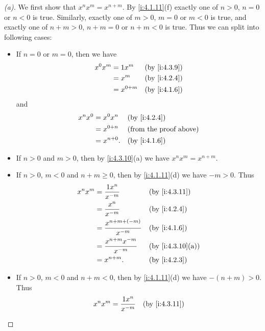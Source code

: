 \begin{proof}[(a)]
  We first show that \(x^n x^m = x^{n + m}\).
  By \cref{i:4.1.11}(f) exactly one of \(n > 0\), \(n = 0\) or \(n < 0\) is true.
  Similarly, exactly one of \(m > 0\), \(m = 0\) or \(m < 0\) is true, and exactly one of \(n + m > 0\), \(n + m = 0\) or \(n + m < 0\) is true.
  Thus we can split into following cases:
  \begin{itemize}
    \item If \(n = 0\) or \(m = 0\), then we have
          \begin{align*}
            x^0 x^m & = 1 x^m     &  & \by{i:4.3.9} \\
                    & = x^m       &  & \by{i:4.2.4} \\
                    & = x^{0 + m} &  & \by{i:4.1.6}
          \end{align*}
          and
          \begin{align*}
            x^n x^0 & = x^0 x^n    &  & \by{i:4.2.4}                  \\
                    & = x^{0 + n}  &  & \text{(from the proof above)} \\
                    & = x^{n + 0}. &  & \by{i:4.1.6}
          \end{align*}
    \item If \(n > 0\) and \(m > 0\), then by \cref{i:4.3.10}(a) we have \(x^n x^m = x^{n + m}\).
    \item If \(n > 0\), \(m < 0\) and \(n + m \geq 0\), then by \cref{i:4.1.11}(d) we have \(-m > 0\).
          Thus
          \begin{align*}
            x^n x^m & = \dfrac{1 x^n}{x^{-m}}            &  & \by{i:4.3.11}    \\
                    & = \dfrac{x^n}{x^{-m}}              &  & \by{i:4.2.4}     \\
                    & = \dfrac{x^{n + m + (-m)}}{x^{-m}} &  & \by{i:4.1.6}     \\
                    & = \dfrac{x^{n + m} x^{-m}}{x^{-m}} &  & \by{i:4.3.10}[a] \\
                    & = x^{n + m}.                       &  & \by{i:4.2.3}
          \end{align*}
    \item If \(n > 0\), \(m < 0\) and \(n + m < 0\), then by \cref{i:4.1.11}(d) we have \(-(n + m) > 0\).
          Thus
          \begin{align*}
            x^n x^m & = \dfrac{1 x^n}{x^{-m}}              &  & \by{i:4.3.11}    \\

\end{align*}
\end{itemize}
\end{proof}
